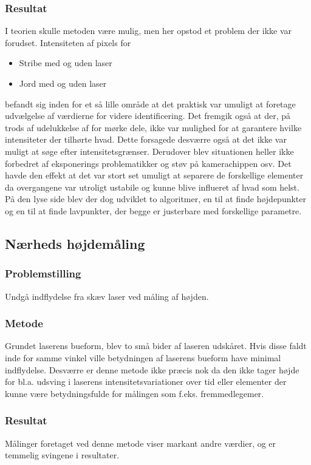 \subsubsection{Resultat}
I teorien skulle metoden være mulig, men her opstod et problem der ikke var forudset. Intensiteten af pixels for
\begin{itemize}
	\item Stribe med og uden laser
	\item Jord med og uden laser
\end{itemize}
befandt sig inden for et så lille område at det praktisk var umuligt at foretage udvælgelse af værdierne for videre identificering. Det fremgik også at der, på trods af udelukkelse af for mørke dele, ikke var mulighed for at garantere hvilke intensiteter der tilhørte hvad. Dette forsagede desværre også at det ikke var muligt at søge efter intensitetsgrænser.
Derudover blev situationen heller ikke forbedret af eksponerings problematikker og støv på kamerachippen osv.
Det havde den effekt at det var stort set umuligt at separere de forskellige elementer da overgangene var utroligt ustabile og kunne blive influeret af hvad som helst. På den lyse side blev der dog udviklet to algoritmer, en til at finde højdepunkter og en til at finde lavpunkter, der begge er justerbare med forskellige parametre.
\newpage
\subsection{Nærheds højdemåling}
\subsubsection{Problemstilling}
Undgå indflydelse fra skæv laser ved måling af højden.

\subsubsection{Metode}
Grundet laserens bueform, blev to små bider af laseren udskåret. Hvis disse faldt inde for samme vinkel ville betydningen af laserens bueform have minimal indflydelse. Desværre er denne metode ikke præcis nok da den ikke tager højde for bl.a. udsving i laserens intensitetsvariationer over tid eller elementer der kunne være betydningsfulde for målingen som f.eks. fremmedlegemer.

\subsubsection{Resultat}
Målinger foretaget ved denne metode viser markant andre værdier, og er temmelig svingene i resultater.
